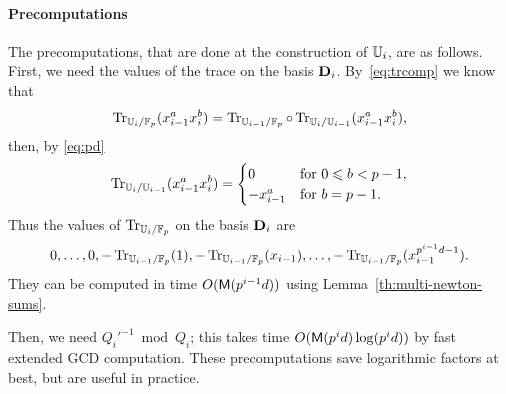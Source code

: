 \paragraph{Precomputations}
The precomputations, that are done at the construction of $\mathbb{U}_i$, are
as follows.  First, we need the values of the trace on the basis
$\mathbf{D}_i$. By~\eqref{eq:trcomp} we know that
\begin{equation}
  \label{eq:86}
  \operatorname{Tr}_{\mathbb{U}_i/\mathbb{F}_p}(x_{i-1}^ax_i^b) = 
  \operatorname{Tr}_{\mathbb{U}_{i-1}/\mathbb{F}_p}\circ\operatorname{Tr}_{\mathbb{U}_i/\mathbb{U}_{i-1}}(x_{i-1}^ax_i^b)
  \text{,}
\end{equation}
then, by \eqref{eq:pd}
\begin{equation}
  \label{eq:87}
  \operatorname{Tr}_{\mathbb{U}_i/\mathbb{U}_{i-1}}(x_{i-1}^ax_i^b) =
  \begin{cases}
    0 &\text{for $0\leqslant b < p-1$,}\\
    -x_{i-1}^a &\text{for $b=p-1$.}
  \end{cases}
\end{equation}
Thus the values of $\operatorname{Tr}_{\mathbb{U}_i/\mathbb{F}_p}$ on the basis $\mathbf{D}_i$ are 
\begin{equation}
  \label{eq:88}
  0, \ldots, 0, -\operatorname{Tr}_{\mathbb{U}_{i-1}/\mathbb{F}_p}(1), -\operatorname{Tr}_{\mathbb{U}_{i-1}/\mathbb{F}_p}(x_{i-1}), \ldots, -\operatorname{Tr}_{\mathbb{U}_{i-1}/\mathbb{F}_p}(x_{i-1}^{p^{i-1}d-1})
  \text{.}
\end{equation}
They can be computed in time $O(\mathsf{M}(p^{i-1}d))$ using
Lemma~\ref{th:multi-newton-sums}.

Then, we need ${Q_i'}^{-1} \bmod Q_i$; this takes time $O(\mathsf{M}(p^id)
\log(p^id))$ by fast extended GCD computation.  These precomputations
save logarithmic factors at best, but are useful in practice.


%
